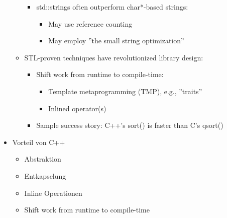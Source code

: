 \begin{itemize}
\begin{itemize}
		\begin{itemize}
			\item std::strings often outperform char*-based strings:
			\begin{itemize}
				\item May use reference counting
				\item May employ ''the small string optimization''
			\end{itemize}
		\end{itemize}
		\item STL-proven techniques have revolutionized library design:
		\begin{itemize}
			\item Shift work from runtime to compile-time:
			\begin{itemize}
				\item Template metaprogramming (TMP), e.g., ''traits''
				\item Inlined operator(s)
			\end{itemize}
			\item Sample success story: C++'s sort() is faster than C's qsort()
		\end{itemize}
	\end{itemize}
	\item Vorteil von C++
    	\begin{itemize}
	        \item Abstraktion
	        \item Entkapselung
	        \item Inline Operationen
	        \item Shift work from runtime to compile-time
    	\end{itemize}
\end{itemize}

